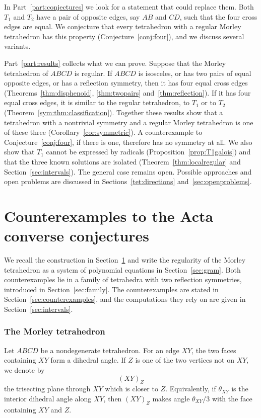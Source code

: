 \documentclass[11pt]{article}
\theoremstyle{definition}
\theoremstyle{remark}
\begin{document}
In Part~\ref{part:conjectures} we look for a statement that could replace them. Both $T_1$ and $T_2$ have a pair of opposite edges, say $AB$ and $CD$, such that the four cross edges are equal. We conjecture that every tetrahedron with a regular Morley tetrahedron has this property (Conjecture~\ref{conj:four}), and we discuss several variants.

Part~\ref{part:results} collects what we can prove. Suppose that the Morley tetrahedron of $ABCD$ is regular. If $ABCD$ is isosceles, or has two pairs of equal opposite edges, or has a reflection symmetry, then it has four equal cross edges (Theorems~\ref{thm:disphenoid}, \ref{thm:twopairs} and~\ref{thm:reflection}). If it has four equal cross edges, it is similar to the regular tetrahedron, to $T_1$ or to $T_2$ (Theorem~\ref{sym:thm:classification}). Together these results show that a tetrahedron with a nontrivial symmetry and a regular Morley tetrahedron is one of these three (Corollary~\ref{cor:symmetric}). A counterexample to Conjecture~\ref{conj:four}, if there is one, therefore has no symmetry at all. We also show that $T_1$ cannot be expressed by radicals (Proposition~\ref{prop:T1galois}) and that the three known solutions are isolated (Theorem~\ref{thm:localregular} and Section~\ref{sec:intervals}). The general case remains open. Possible approaches and open problems are discussed in Sections~\ref{tet:directions} and~\ref{sec:openproblems}.

\part{Counterexamples to the Acta converse conjectures}
\label{part:counterexamples}

We recall the construction in Section~\ref{sec:morley} and write the regularity of the Morley tetrahedron as a system of polynomial equations in Section~\ref{sec:gram}. Both counterexamples lie in a family of tetrahedra with two reflection symmetries, introduced in Section~\ref{sec:family}. The counterexamples are stated in Section~\ref{sec:counterexamples}, and the computations they rely on are given in Section~\ref{sec:intervals}.

\section{The Morley tetrahedron}\label{sec:morley}

Let $ABCD$ be a nondegenerate tetrahedron. For an edge $XY$, the two faces containing $XY$ form a dihedral angle. If $Z$ is one of the two vertices not on $XY$, we denote by
\[
(XY)_Z
\]
the trisecting plane through $XY$ which is closer to $Z$. Equivalently, if $\theta_{XY}$ is the interior dihedral angle along $XY$, then $(XY)_Z$ makes angle $\theta_{XY}/3$ with the face containing $XY$ and $Z$.
\end{document}
